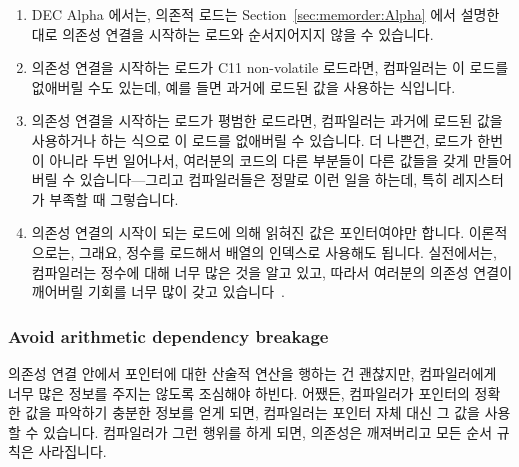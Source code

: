 \begin{enumerate}
\item	DEC Alpha 에서는, 의존적 로드는 Section~\ref{sec:memorder:Alpha} 에서
	설명한 대로 의존성 연결을 시작하는 로드와 순서지어지지 않을 수
	있습니다.
\item	의존성 연결을 시작하는 로드가 C11 non-volatile
	 로드라면, 컴파일러는 이 로드를 없애버릴 수도
	있는데, 예를 들면 과거에 로드된 값을 사용하는 식입니다.
\item	의존성 연결을 시작하는 로드가 평범한 로드라면, 컴파일러는 과거에 로드된
	값을 사용하거나 하는 식으로 이 로드를 없애버릴 수 있습니다.
	더 나쁜건, 로드가 한번이 아니라 두번 일어나서, 여러분의 코드의 다른
	부분들이 다른 값들을 갖게 만들어 버릴 수 있습니다---그리고 컴파일러들은
	정말로 이런 일을 하는데, 특히 레지스터가 부족할 때 그렇습니다.
\item	의존성 연결의 시작이 되는 로드에 의해 읽혀진 값은 포인터여야만 합니다.
	이론적으로는, 그래요, 정수를 로드해서 배열의 인덱스로 사용해도 됩니다.
	실전에서는, 컴파일러는 정수에 대해 너무 많은 것을 알고 있고, 따라서
	여러분의 의존성 연결이 깨어버릴 기회를 너무 많이 갖고
	있습니다~\cite{PaulEMcKennneyConsumeP0190R4}.

\end{enumerate}

\subsubsection{Avoid arithmetic dependency breakage}
의존성 연결 안에서 포인터에 대한 산술적 연산을 행하는 건 괜찮지만, 컴파일러에게
너무 많은 정보를 주지는 않도록 조심해야 하빈다.
어쨌든, 컴파일러가 포인터의 정확한 값을 파악하기 충분한 정보를 얻게 되면,
컴파일러는 포인터 자체 대신 그 값을 사용할 수 있습니다.
컴파일러가 그런 행위를 하게 되면, 의존성은 깨져버리고 모든 순서 규칙은
사라집니다.
\iffalse

